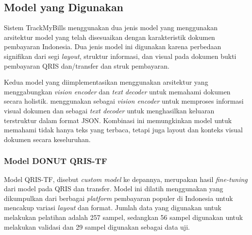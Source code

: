 \subsection{Model yang Digunakan}
\label{subsec:model-yang-digunakan}

Sistem TrackMyBills menggunakan dua jenis model yang menggunakan arsitektur model \donut{} yang telah disesuaikan dengan karakteristik dokumen pembayaran Indonesia. Dua jenis model ini digunakan karena perbedaan signifikan dari segi \emph{layout}, struktur informasi, dan visual pada dokumen bukti pembayaran QRIS dan/transfer dan struk pembayaran.

Kedua model yang diimplementasikan menggunakan arsitektur \transformer{} yang menggabungkan \emph{vision encoder} dan \emph{text decoder} untuk memahami dokumen secara holistik. \donut{} menggunakan \swin{} sebagai \emph{vision encoder} untuk memproses informasi visual dokumen dan \bart{} sebagai \emph{text decoder} untuk menghasilkan keluaran terstruktur dalam format JSON. Kombinasi ini memungkinkan model untuk memahami tidak hanya teks yang terbaca, tetapi juga layout dan konteks visual dokumen secara keseluruhan.


\subsubsection{Model DONUT QRIS-TF}
\label{subsubsec:donut-qris-tf}

Model \donut{} QRIS-TF, disebut \emph{custom model} ke depannya, merupakan hasil \emph{fine-tuning} dari model \donutcord{} pada \dataset{} QRIS dan transfer. Model ini dilatih menggunakan \dataset{} yang dikumpulkan dari berbagai \emph{platform} pembayaran populer di Indonesia untuk mencakup variasi \emph{layout} dan format. Jumlah data yang digunakan untuk melakukan pelatihan adalah 257 sampel, sedangkan 56 sampel digunakan untuk melakukan validasi dan 29 sampel digunakan sebagai data uji.

